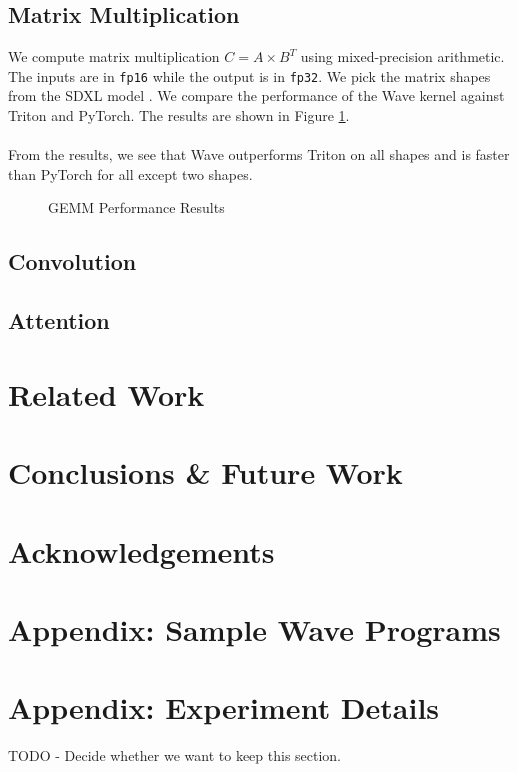 \documentclass{article}
\begin{document}
\subsection{Matrix Multiplication}
We compute matrix multiplication $C = A \times B^{T}$ using mixed-precision
arithmetic. The inputs are in \texttt{fp16} while the output is in \texttt{fp32}.
We pick the matrix shapes from the SDXL model \cite{podell2023sdxlimprovinglatentdiffusion}.
We compare the performance of the Wave kernel against Triton and PyTorch. The results are shown in Figure \ref{fig:gemm_results}.
\\ \\
From the results, we see that Wave outperforms Triton on all shapes and is faster
than PyTorch for all except two shapes.


\begin{figure}[htbp]
    \def\svgwidth{0.5\textwidth}
    
    \caption{GEMM Performance Results}
    \label{fig:gemm_results}
\end{figure}

\subsection{Convolution}
\subsection{Attention}

\section{Related Work}
\label{section:related_work}

\section{Conclusions \& Future Work}
\label{section:conclusions}

\section{Acknowledgements}
\label{section:acknowledgements}

\section{Appendix: Sample Wave Programs}
\label{section:samples}

\section{Appendix: Experiment Details}
TODO - Decide whether we want to keep this section.
\label{section:details}
\end{document}
